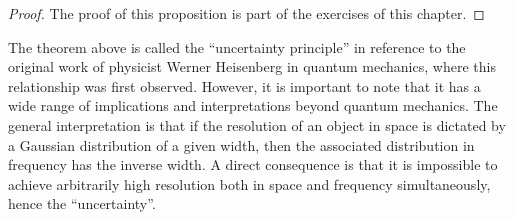 \begin{proof}
  The proof of this proposition is part of the exercises of this chapter.
\end{proof}
The theorem above is called the ``uncertainty principle'' in reference to the original work
of physicist Werner Heisenberg in quantum mechanics, where this relationship was first observed.
However, it is important to note that it has a wide range of implications and interpretations
beyond quantum mechanics. The general interpretation is that if the resolution of an object in space is dictated by a Gaussian distribution of a given width, then the associated distribution in frequency has the inverse width. A direct consequence is that it is impossible to achieve arbitrarily high resolution both in space and frequency simultaneously, hence the ``uncertainty''.
